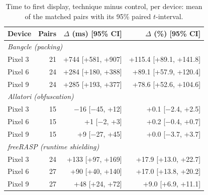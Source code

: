 \begin{table}[t]
\centering
\small
\caption{Time to first display, technique minus control, per device: mean of the matched pairs with its 95\% paired $t$-interval.}
\label{tab:launch}
\begin{tabular}{lrrr}
\toprule
\textbf{Device} & \textbf{Pairs} & \textbf{$\Delta$ (ms) [95\% CI]} & \textbf{$\Delta$ (\%) [95\% CI]} \\
\midrule
\multicolumn{4}{l}{\textit{Bangcle (packing)}} \\
Pixel 3 & 21 & +744 [+581, +907] & +115.4 [+89.1, +141.8] \\
Pixel 6 & 24 & +284 [+180, +388] & +89.1 [+57.9, +120.4] \\
Pixel 9 & 24 & +285 [+193, +377] & +78.6 [+52.6, +104.6] \\
\midrule
\multicolumn{4}{l}{\textit{Allatori (obfuscation)}} \\
Pixel 3 & 15 & $-$16 [$-$45, +12] & +0.1 [$-$2.4, +2.5] \\
Pixel 6 & 15 & +1 [$-$2, +3] & +0.2 [$-$0.4, +0.7] \\
Pixel 9 & 15 & +9 [$-$27, +45] & +0.0 [$-$3.7, +3.7] \\
\midrule
\multicolumn{4}{l}{\textit{freeRASP (runtime shielding)}} \\
Pixel 3 & 24 & +133 [+97, +169] & +17.9 [+13.0, +22.7] \\
Pixel 6 & 27 & +90 [+40, +140] & +17.0 [+13.8, +20.2] \\
Pixel 9 & 27 & +48 [+24, +72] & +9.0 [+6.9, +11.1] \\
\bottomrule
\end{tabular}
\end{table}
